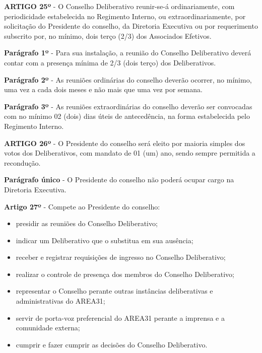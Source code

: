 \textbf{ARTIGO 25º} - O Conselho Deliberativo reunir-se-á ordinariamente, 
com periodicidade estabelecida no Regimento Interno, ou extraordinariamente, 
por solicitação do Presidente do conselho, da Diretoria Executiva ou por 
requerimento subscrito por, no mínimo, dois terço (2/3) 
dos Associados Efetivos.

\bigskip

\textbf{Parágrafo 1º} - Para sua instalação, a reunião do Conselho 
Deliberativo deverá contar com a presença mínima de 2/3 
(dois terço) dos Deliberativos.

\bigskip

\textbf{Parágrafo 2º} - As reuniões ordinárias do conselho deverão ocorrer, 
no mínimo, uma vez a cada dois meses e não mais que uma vez por semana. 

\bigskip

\textbf{Parágrafo 3º} - As reuniões extraordinárias do conselho deverão ser 
convocadas com no mínimo 02 (dois) dias úteis de antecedência, 
na forma estabelecida pelo Regimento Interno.

\bigskip

\textbf{ARTIGO 26º} - O Presidente do conselho será eleito por maioria 
simples dos votos dos Deliberativos, com mandato de 01 (um) ano, 
sendo sempre permitida a recondução.

\textbf{Parágrafo único} - O Presidente do conselho não poderá ocupar cargo 
na Diretoria Executiva.

\bigskip

\textbf{Artigo 27º} - Compete ao Presidente do conselho:

\begin{itemize}
    \item presidir as reuniões do Conselho Deliberativo;
    \item indicar um Deliberativo que o substitua em sua ausência;
    \item receber e registrar requisições de ingresso no Conselho Deliberativo;
    \item realizar o controle de presença dos membros do Conselho Deliberativo;
    \item representar o Conselho perante outras instâncias deliberativas e 
        administrativas do AREA31;
    \item servir de porta-voz preferencial do AREA31 perante a imprensa e 
        a comunidade externa;
    \item cumprir e fazer cumprir as decisões do Conselho Deliberativo.
\end{itemize}

